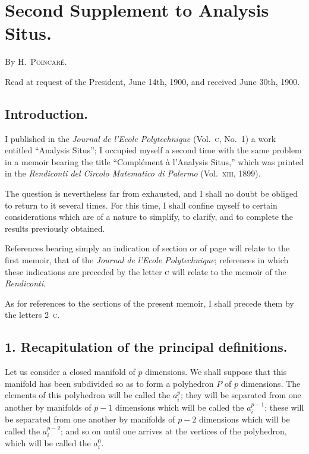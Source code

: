 \documentclass{article}
\begin{document}

\section*{Second Supplement to Analysis Situs.}

By H.~\textsc{Poincaré}.

Read at request of the President, June 14th, 1900, and received June 30th, 1900.

\subsection*{Introduction.}

I published in the \emph{Journal de l'Ecole Polytechnique} (Vol.\ \textsc{c}, No.~1) a work entitled “Analysis Situs”; I occupied myself a second time with the same problem in a memoir bearing the title “Complément à l'Analysis Situs,” which was printed in the \emph{Rendiconti del Circolo Matematico di Palermo} (Vol.\ \textsc{xiii}, 1899).

The question is nevertheless far from exhausted, and I shall no doubt be obliged to return to it several times. For this time, I shall confine myself to certain considerations which are of a nature to simplify, to clarify, and to complete the results previously obtained.

References bearing simply an indication of section or of page will relate to the first memoir, that of the \emph{Journal de l'Ecole Polytechnique}; references in which these indications are preceded by the letter \textsc{c} will relate to the memoir of the \emph{Rendiconti}.

As for references to the sections of the present memoir, I shall precede them by the letters 2~\textsc{c}.

\subsection*{1. Recapitulation of the principal definitions.}

Let us consider a closed manifold of $p$ dimensions. We shall suppose that this manifold has been subdivided so as to form a polyhedron $P$ of $p$ dimensions. The elements of this polyhedron will be called the $a^{p}_{i}$; they will be separated from one another by manifolds of $p-1$ dimensions which will be called the $a^{p-1}_{i}$; these will be separated from one another by manifolds of $p-2$ dimensions which will be called the $a^{p-2}_{i}$; and so on until one arrives at the vertices of the polyhedron, which will be called the $a^{0}_{i}$.
\end{document}
